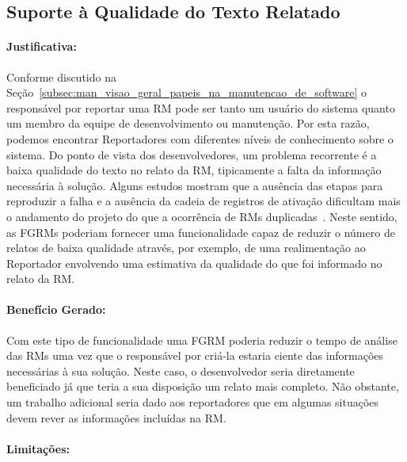 \subsection{Suporte à Qualidade do Texto Relatado}
\label{sub:supote_a_qualidade_do_relato}


\paragraph{Justificativa:}
\label{par:justificativa_s01}

Conforme discutido na
Seção~\ref{subsec:man_visao_geral_papeis_na_manutencao_de_software} o
responsável por reportar uma RM pode ser tanto um usuário do sistema quanto um
membro da equipe de desenvolvimento ou manutenção. Por esta razão, podemos
encontrar Reportadores com diferentes níveis de conhecimento sobre o sistema.
Do ponto de vista dos desenvolvedores, um problema recorrente é a baixa
qualidade do texto no relato da RM, tipicamente a falta da informação necessária
à solução. Alguns estudos mostram que a ausência das etapas para reproduzir a
falha e a ausência da cadeia de registros de ativação dificultam mais o
andamento do projeto do que a ocorrência de RMs
duplicadas~\cite{bettenburg2008makes, bettenburg2007quality}. Neste sentido, as
FGRMs poderiam fornecer uma funcionalidade capaz de reduzir o número de relatos
de baixa qualidade através, por exemplo, de uma realimentação ao Reportador
envolvendo uma estimativa da qualidade do que foi informado no relato da RM\@.

\paragraph{Benefício Gerado:}
\label{par:beneficio_s01}

Com este tipo de funcionalidade uma FGRM poderia reduzir o tempo de análise das
RMs uma vez que o responsável por criá-la estaria ciente das informações
necessárias à sua solução. Neste caso, o desenvolvedor seria diretamente
beneficiado já que teria a sua disposição um relato mais completo. Não
obstante, um trabalho adicional seria dado aos reportadores que em algumas
situações devem rever as informações incluídas na RM\@.

\paragraph{Limitações:}
\label{par:limitacoes_s01}

